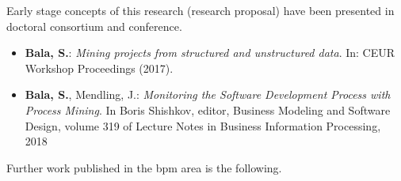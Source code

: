 \noindent Early stage concepts of this research (research proposal) have been presented in doctoral consortium and conference.
\begin{itemize}
	\item \textbf{Bala, S.}: \textit{Mining projects from structured and unstructured data}. In: CEUR Workshop Proceedings (2017). \cite[]{Bala2017b}

	\item \textbf{Bala, S.}, Mendling, J.: \textit{Monitoring the Software Development Process
		with Process Mining}. In Boris Shishkov, editor, Business Modeling and Software
	Design, volume 319 of Lecture Notes in Business Information Processing, 2018 \citep{Bala2018b} 	
\end{itemize}	
	

\noindent Further work published in the \gls{bpm} area is the following.


